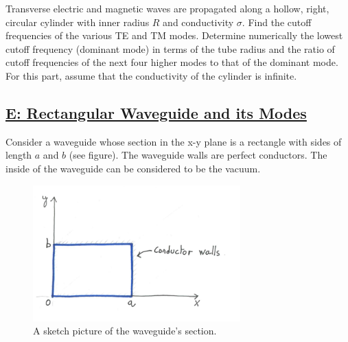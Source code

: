 Transverse electric and magnetic waves are propagated along a hollow, right, circular cylinder with inner radius $R$ and conductivity $\sigma$. Find the cutoff frequencies of the various TE and TM modes. Determine numerically the lowest cutoff frequency (dominant mode) in terms of the tube radius and the ratio of cutoff frequencies of the next four higher modes to that of the dominant mode. For this part, assume that the conductivity of the cylinder is infinite.

\subsection{\hyperref[E: Rectangular Waveguide and its Modes]{E: Rectangular Waveguide and its Modes}}

Consider a waveguide whose section in the x-y plane is a rectangle with sides of length $a$ and $b$ (see figure). The waveguide walls are perfect conductors. The inside of the waveguide can be considered to be the vacuum.

\begin{figure}[h]
	\includegraphics[width=8cm]{figures/examdec19p3.png}
	\centering
	\caption{A sketch picture of the waveguide's section.}
\end{figure}

